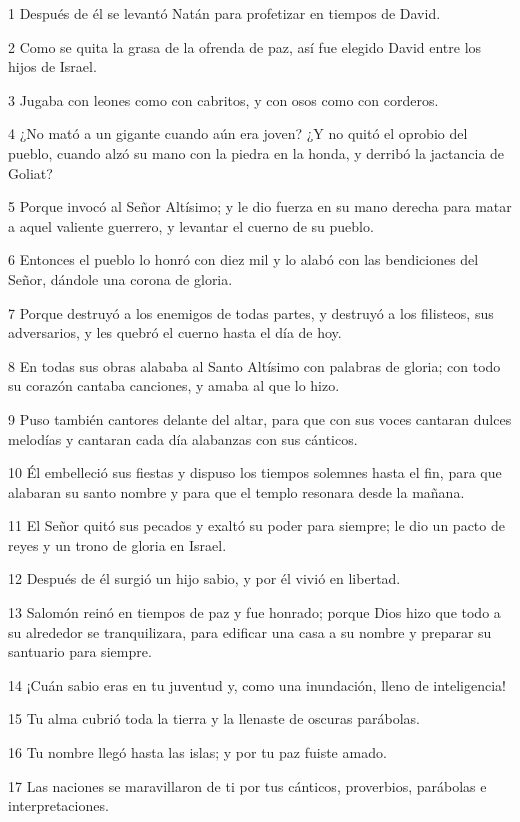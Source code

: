 \par 1 Después de él se levantó Natán para profetizar en tiempos de David.
\par 2 Como se quita la grasa de la ofrenda de paz, así fue elegido David entre los hijos de Israel.
\par 3 Jugaba con leones como con cabritos, y con osos como con corderos.
\par 4 ¿No mató a un gigante cuando aún era joven? ¿Y no quitó el oprobio del pueblo, cuando alzó su mano con la piedra en la honda, y derribó la jactancia de Goliat?
\par 5 Porque invocó al Señor Altísimo; y le dio fuerza en su mano derecha para matar a aquel valiente guerrero, y levantar el cuerno de su pueblo.
\par 6 Entonces el pueblo lo honró con diez mil y lo alabó con las bendiciones del Señor, dándole una corona de gloria.
\par 7 Porque destruyó a los enemigos de todas partes, y destruyó a los filisteos, sus adversarios, y les quebró el cuerno hasta el día de hoy.
\par 8 En todas sus obras alababa al Santo Altísimo con palabras de gloria; con todo su corazón cantaba canciones, y amaba al que lo hizo.
\par 9 Puso también cantores delante del altar, para que con sus voces cantaran dulces melodías y cantaran cada día alabanzas con sus cánticos.
\par 10 Él embelleció sus fiestas y dispuso los tiempos solemnes hasta el fin, para que alabaran su santo nombre y para que el templo resonara desde la mañana.
\par 11 El Señor quitó sus pecados y exaltó su poder para siempre; le dio un pacto de reyes y un trono de gloria en Israel.
\par 12 Después de él surgió un hijo sabio, y por él vivió en libertad.
\par 13 Salomón reinó en tiempos de paz y fue honrado; porque Dios hizo que todo a su alrededor se tranquilizara, para edificar una casa a su nombre y preparar su santuario para siempre.
\par 14 ¡Cuán sabio eras en tu juventud y, como una inundación, lleno de inteligencia!
\par 15 Tu alma cubrió toda la tierra y la llenaste de oscuras parábolas.
\par 16 Tu nombre llegó hasta las islas; y por tu paz fuiste amado.
\par 17 Las naciones se maravillaron de ti por tus cánticos, proverbios, parábolas e interpretaciones.

